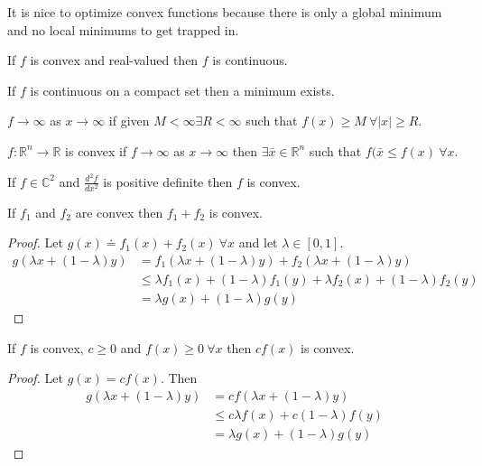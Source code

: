 \documentclass[lecture,12pt,]{pcms-l}
\theoremstyle{example}
\begin{document}
It is nice to optimize convex functions because there is only a global minimum and no local minimums to get trapped in.

\begin{theorem}
If $f$ is convex and real-valued then $f$ is continuous.
\end{theorem}

\begin{theorem}
If $f$ is continuous on a compact set then a minimum exists.
\end{theorem}

\begin{definition}
$f\to\infty$ as $x\to\infty$ if given $M<\infty \exists R<\infty$ such that $f(x)\geq M ~\forall |x|\geq R$.
\end{definition}

\begin{theorem}
$f:\mathbb{R}^n\to\mathbb{R}$ is convex if $f\to\infty$ as $x\to\infty$ then $\exists \bar{x}\in\mathbb{R}^n$ such that $f(\bar{x}\leq f(x) ~\forall x$.
\end{theorem}

\begin{theorem}
If $f\in\mathbb{C}^2$ and $\frac{d^2f}{dx^2}$ is positive definite then $f$ is convex.
\end{theorem}

\begin{theorem}
\label{th:sumConvex}
If $f_1$ and $f_2$ are convex then $f_1+f_2$ is convex.
\end{theorem}

\begin{proof}
Let $g(x) \doteq f_1(x) + f_2(x) ~\forall x$ and let $\lambda\in[0,1]$.
\begin{align*}
g(\lambda x + (1-\lambda)y) &= f_1(\lambda x+(1-\lambda)y) + f_2(\lambda x+(1-\lambda)y) \\
&\leq \lambda f_1(x) + (1-\lambda)f_1(y) + \lambda f_2(x) + (1-\lambda)f_2(y) \\
&= \lambda g(x) + (1-\lambda)g(y)
\end{align*}
\end{proof}

\begin{theorem}
\label{th:cfxconvex}
If $f$ is convex, $c\geq 0$ and $f(x)\geq 0 ~\forall x$ then $cf(x)$ is convex.
\end{theorem}

\begin{proof}
Let $g(x)=cf(x)$. Then
\begin{align*}
g(\lambda x+(1-\lambda)y) &= cf(\lambda x+(1-\lambda)y) \\
&\leq c\lambda f(x) + c(1-\lambda)f(y) \\
&= \lambda g(x) + (1-\lambda)g(y)
\end{align*}
\end{proof}
\end{document}
